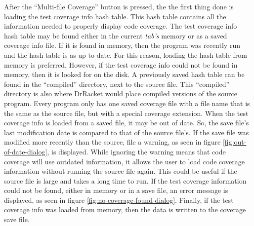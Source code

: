 After the ``Multi-file Coverage'' button is pressed, the the first thing done is loading the test coverage info hash table. This hash table contains all the information needed to properly display code coverage. The test coverage info hash table may be found either in the current \emph{tab's} memory or as a saved coverage info file. If it is found in memory, then the program was recently run and the hash table is as up to date. For this reason, loading the hash table from memory is preferred. However, if the test coverage info could not be found in memory, then it is looked for on the disk. A previously saved hash table can be found in the ``compiled'' directory, next to the source file. This ``compiled'' directory is also where DrRacket would place compiled versions of the source program. Every program only has one saved coverage file with a file name that is the same as the source file, but with a special coverage extension. When the test coverage info is loaded from a saved file, it may be out of date. So, the save file's last modification date is compared to that of the source file's. If the save file was modified more recently than the source, file a warning, as seen in figure \ref{fig:out-of-date-dialog}, is displayed. While ignoring the warning means that code coverage will use outdated information, it allows the user to load code coverage information without running the source file again. This could be useful if the source file is large and takes a long time to run. If the test coverage information could not be found, either in memory or in a save file, an error message is displayed, as seen in figure \ref{fig:no-coverage-found-dialog}. Finally, if the test coverage info was loaded from memory, then the data is written to the coverage save file.



